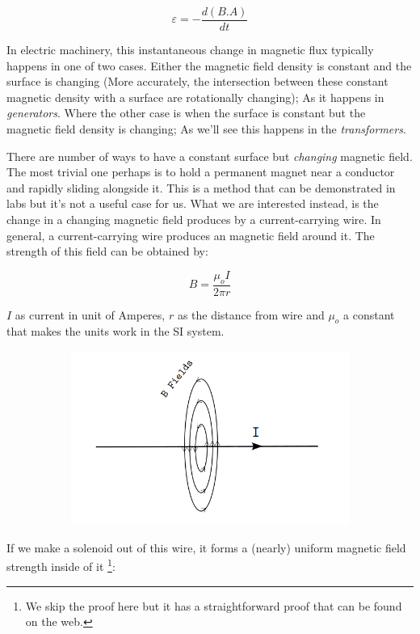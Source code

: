 \documentclass{article}
\begin{document}
	$$ \varepsilon = -\frac{d(B.A)}{d t} $$
	
	In electric machinery, this instantaneous change in magnetic flux typically happens in one of two cases.
	Either the magnetic field density is constant and the surface is changing (More accurately, the intersection between these constant magnetic density with a surface are rotationally changing); As it happens in \textit{generators}.
	Where the other case is when the surface is constant but the magnetic field density is changing; As we'll see this happens in the \textit{transformers}.

	There are number of ways to have a constant surface but \textit{changing} magnetic field.
	The most trivial one perhaps is to hold a permanent magnet near a conductor and rapidly sliding alongside it.
	This is a method that can be demonstrated in labs but it's not a useful case for us. 
	What we are interested instead, is the change in a changing magnetic field produces by a current-carrying wire. 
	In general, a current-carrying wire produces an magnetic field around it.
	The strength of this field can be obtained by:

	$$ B = \frac{\mu_o I}{2 \pi r} $$
	
	$I$ as current in unit of Amperes, $r$ as the distance from wire and $\mu_o$ a constant that makes the units work in the SI system.

	\begin{figure}[h!]
	\centering
	\begin{subfigure}[b]{0.8\linewidth}
		\includegraphics[width=\linewidth]{magnetic_field_around_a_wire.png}
	\end{subfigure}
	\end{figure}

	If we make a solenoid out of this wire, it forms a (nearly) uniform magnetic field strength inside of it \footnote[1]{We skip the proof here but it has a straightforward proof that can be found on the web.}:
	
\end{document}
